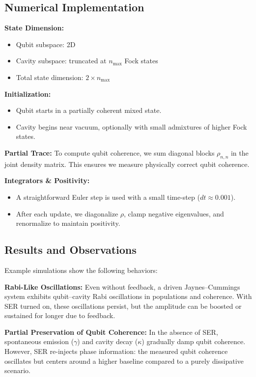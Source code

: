 \documentclass[12pt]{article}
\begin{document}
\subsection{Numerical Implementation}
\textbf{State Dimension:}
\begin{itemize}
    \item Qubit subspace: 2D
    \item Cavity subspace: truncated at $n_{\text{max}}$ Fock states
    \item Total state dimension: $2 \times n_{\text{max}}$
\end{itemize}

\textbf{Initialization:}
\begin{itemize}
    \item Qubit starts in a partially coherent mixed state.
    \item Cavity begins near vacuum, optionally with small admixtures of higher Fock states.
\end{itemize}

\textbf{Partial Trace:}
To compute qubit coherence, we sum diagonal blocks $\rho_{n,n}$ in the joint density matrix. This ensures we measure physically correct qubit coherence.

\textbf{Integrators \& Positivity:}
\begin{itemize}
    \item A straightforward Euler step is used with a small time-step ($dt \approx 0.001$).
    \item After each update, we diagonalize $\rho$, clamp negative eigenvalues, and renormalize to maintain positivity.
\end{itemize}

\subsection{Results and Observations}
Example simulations show the following behaviors:

\textbf{Rabi-Like Oscillations:}
Even without feedback, a driven Jaynes--Cummings system exhibits qubit--cavity Rabi oscillations in populations and coherence. With SER turned on, these oscillations persist, but the amplitude can be boosted or sustained for longer due to feedback.

\textbf{Partial Preservation of Qubit Coherence:}
In the absence of SER, spontaneous emission ($\gamma$) and cavity decay ($\kappa$) gradually damp qubit coherence. However, SER re-injects phase information: the measured qubit coherence oscillates but centers around a higher baseline compared to a purely dissipative scenario.
\end{document}
